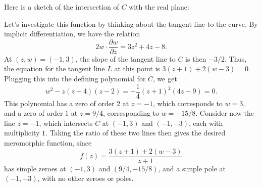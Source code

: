 \documentclass[expanded]{lkx_pset}
\begin{document}
\begin{solution}
	Here is a sketch of the intersection of $C$ with the real plane:
	\begin{center}
	\end{center}
	Let's investigate this function by thinking about the tangent line to the curve. By implicit differentiation, we have the relation
	\[
		2w\cdot \frac{\partial w}{\partial z} = 3z^2 + 4z - 8.
	\]
	At $(z,w)=(-1,3)$, the slope of the tangent line to $C$ is then $-3/2$. Thus, the equation for the tangent line $L$ at this point is
	$3(z+1)+2(w-3)=0.$ Plugging this into the defining polynomial for $C$, we get
	\[
		w^2 - z(z+4)(z-2) = -\frac{1}{4}(z+1)^2 (4z-9) = 0.
	\]
	This polynomial has a zero of order $2$ at $z=-1$, which corresponds to $w=3$, and a zero of order $1$ at $z=9/4$, corresponding to $w=-15/8$. Consider now the line $z=-1$, which intersects $C$ at $(-1,3)$ and $(-1,-3)$, each with multiplicity $1$. Taking the ratio of these two lines then gives the desired meromorphic function, since
	\[
		f(z) = \frac{3(z+1)+2(w-3)}{z+1}
	\]
	has simple zeroes at $(-1,3)$ and $(9/4, -15/8)$, and a simple pole at $(-1,-3)$, with no other zeroes or poles.
\end{solution}
\end{document}
